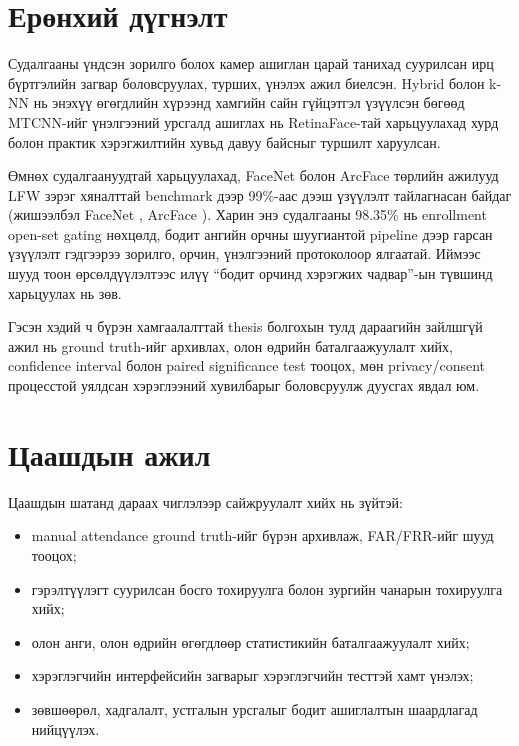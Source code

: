 \section{Ерөнхий дүгнэлт}

Судалгааны үндсэн зорилго болох камер ашиглан царай танихад суурилсан ирц бүртгэлийн загвар боловсруулах, турших, үнэлэх ажил биелсэн. Hybrid болон k-NN нь энэхүү өгөгдлийн хүрээнд хамгийн сайн гүйцэтгэл үзүүлсэн бөгөөд MTCNN-ийг үнэлгээний урсгалд ашиглах нь RetinaFace-тай харьцуулахад хурд болон практик хэрэгжилтийн хувьд давуу байсныг туршилт харуулсан.

Өмнөх судалгаануудтай харьцуулахад, FaceNet болон ArcFace төрлийн ажилууд LFW зэрэг хяналттай benchmark дээр 99\%-аас дээш үзүүлэлт тайлагнасан байдаг (жишээлбэл FaceNet \cite{schroff2015facenet}, ArcFace \cite{deng2019arcface}). Харин энэ судалгааны 98.35\% нь enrollment open-set gating нөхцөлд, бодит ангийн орчны шуугиантой pipeline дээр гарсан үзүүлэлт гэдгээрээ зорилго, орчин, үнэлгээний протоколоор ялгаатай. Иймээс шууд тоон өрсөлдүүлэлтээс илүү ``бодит орчинд хэрэгжих чадвар''-ын түвшинд харьцуулах нь зөв.

Гэсэн хэдий ч бүрэн хамгаалалттай thesis болгохын тулд дараагийн зайлшгүй ажил нь ground truth-ийг архивлах, олон өдрийн баталгаажуулалт хийх, confidence interval болон paired significance test тооцох, мөн privacy/consent процесстой уялдсан хэрэглээний хувилбарыг боловсруулж дуусгах явдал юм.

\section{Цаашдын ажил}

Цаашдын шатанд дараах чиглэлээр сайжруулалт хийх нь зүйтэй:
\begin{itemize}
    \item manual attendance ground truth-ийг бүрэн архивлаж, FAR/FRR-ийг шууд тооцох;
    \item гэрэлтүүлэгт суурилсан босго тохируулга болон зургийн чанарын тохируулга хийх;
    \item олон анги, олон өдрийн өгөгдлөөр статистикийн баталгаажуулалт хийх;
    \item хэрэглэгчийн интерфейсийн загварыг хэрэглэгчийн тесттэй хамт үнэлэх;
    \item зөвшөөрөл, хадгалалт, устгалын урсгалыг бодит ашиглалтын шаардлагад нийцүүлэх.
\end{itemize}
